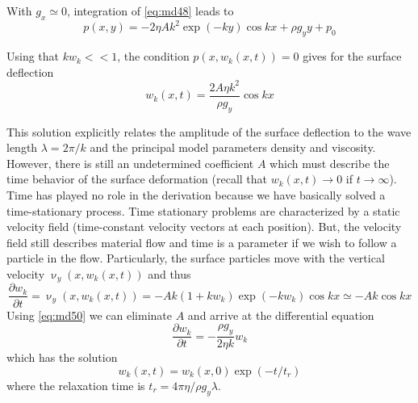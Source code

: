 With $g_x\simeq 0$, integration of \eqref{eq:md48} leads to
\begin{equation}
p(x,y) = -2\eta A k^2 \exp (-ky) \cos kx + \rho g_y y + p_0
\label{eq:md49}
\end{equation} 

\vspace{0.5cm}
\vspace{0.5cm}

Using that $k w_k <<1$, the condition $p(x,w_k(x,t))=0$ gives for the surface deflection
\begin{equation}
w_k(x,t) = \frac{2A\eta k^2}{\rho g_y} \cos kx
\label{eq:md50}
\end{equation} 


This solution explicitly relates the amplitude of the surface deflection to the wave length
$\lambda = 2\pi/k$ and the principal model parameters density and viscosity. However, there is
still an undetermined coefficient $A$ which must describe the time behavior of the surface
deformation (recall that $w_k(x,t)\rightarrow 0$ if $t\rightarrow \infty$).
Time has played no role in the
derivation because we have basically solved a time-stationary process. Time stationary
problems are characterized by a static velocity field (time-constant velocity vectors at
each position). But, the velocity field still describes material flow and time is a parameter
if we wish to follow a particle in the flow. Particularly, the surface particles move with
the vertical velocity $\upnu_y(x,w_k(x,t))$ and thus
\begin{equation}
\frac{\partial w_k}{\partial t} = \upnu_y(x,w_k(x,t)) = -Ak(1+kw_k) \exp (-kw_k) \cos kx
\simeq -Ak \cos kx
\end{equation}
Using \eqref{eq:md50} we can eliminate $A$ and arrive at the differential equation
\begin{equation}
\frac{\partial w_k}{\partial t} = - \frac{\rho g_y}{2 \eta k} w_k
\label{eq:md51}
\end{equation}
which has the solution
\begin{equation}
w_k(x,t) = w_k(x,0) \exp( -t/t_r)
\label{eq:md52}
\end{equation}
where the relaxation time is $t_r= 4\pi \eta/\rho g_y \lambda$.

